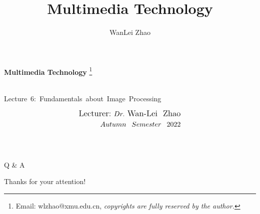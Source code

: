 \documentclass[]{beamer}
\author[Wan-Lei Zhao]{WanLei Zhao}
\title{Multimedia Technology}
\newcommand\blfootnote[1]{
  \begingroup
  \renewcommand\thefootnote{}\footnote{#1}
  \addtocounter{footnote}{-1}
  \endgroup
}
\begin{document}
\begin{frame}
   \begin{center}
    \vspace{24pt}
    \Huge\textbf{Multimedia Technology}\blfootnote{Email: wlzhao@xmu.edu.cn, \textit{copyrights are fully reserved by the author.}}\\
     \Large{\mbox{Lecture 6: Fundamentals about Image Processing}}
    \vspace{36pt}
  \end{center}
  \begin{align*}
   \vspace{18pt}
      \large{\mbox{Lecturer:}~Dr.~\mbox{Wan-Lei~~Zhao}} \\
      \large{Autumn~~Semester~~2022} \\
   \vspace{30pt}
  \end{align*}
\end{frame}





\section{}
\begin{frame}
    \begin{center}
     \vspace{1.1in}
      \Huge{Q \& A}
    \end{center}
  \end{frame}
\begin{frame}
    \begin{center}
     \vspace{1.1in}
      \Huge{Thanks for your attention!}
    \end{center}
  \end{frame}
\end{document}

